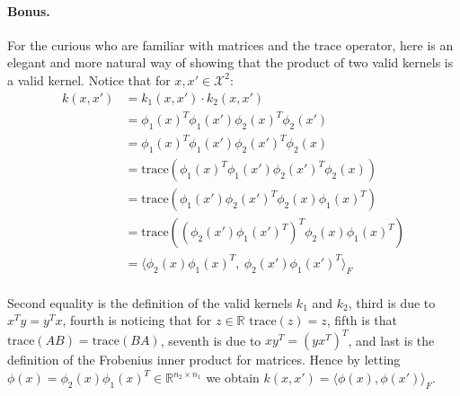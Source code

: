 \documentclass{./../../tex_import/ETHuebung_english}
\begin{document}
\paragraph{Bonus.}

For the curious who are familiar with matrices and the $\text{trace}$ operator, here is an elegant and more natural
way of showing that the product of two valid kernels is a valid kernel.
Notice that for $x, x' \in \mathcal{X}^2$:
\begin{align*}
	k(x, x') &= k_1(x, x') \cdot k_2(x, x') \\
	&= \phi_1(x)^T \phi_1(x') \phi_2(x)^T \phi_2(x') \\
	&= \phi_1(x)^T \phi_1(x') \phi_2(x')^T \phi_2(x) \\
	&= \text{trace}( \phi_1(x)^T \phi_1(x') \phi_2(x')^T \phi_2(x) ) \\
	&= \text{trace}(  \phi_1(x') \phi_2(x')^T \phi_2(x) \phi_1(x)^T) \\
	&= \text{trace}(  (\phi_2(x') \phi_1(x')^T)^T \phi_2(x) \phi_1(x)^T) \\
	&= \langle  \phi_2(x) \phi_1(x)^T , \ \phi_2(x') \phi_1(x')^T  \rangle_F \\
\end{align*}

Second equality is the definition of the valid kernels $k_1$ and $k_2$, third is due to $x^T y = y^T x$, 
fourth is noticing that for $z \in \mathbb{R}$ $\text{trace}(z) = z$,
fifth is that $\text{trace}(A B) = \text{trace}(B A)$, seventh is due to $x y^T = (y x^T)^T$, and last is 
the definition of the Frobenius inner product for matrices.
Hence by letting $\phi(x) =  \phi_2(x) \phi_1(x)^T \in \mathbb{R}^{n_2 \times n_1}$
we obtain $k(x, x') = \langle  \phi(x), \phi(x') \rangle_F$.


\vspace{1cm}



\end{document}

